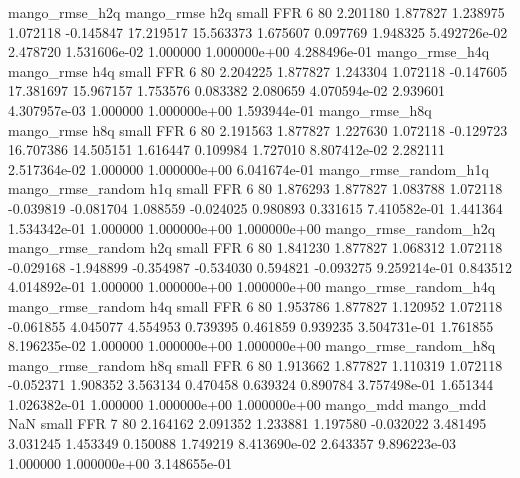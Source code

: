        mango_rmse_h2q        mango_rmse                  h2q      small      FFR                 6 80 2.201180       1.877827 1.238975       1.072118   -0.145847     17.219517     15.563373     1.675607       0.097769  1.948325 5.492726e-02     2.478720   1.531606e-02            1.000000    1.000000e+00        4.288496e-01
       mango_rmse_h4q        mango_rmse                  h4q      small      FFR                 6 80 2.204225       1.877827 1.243304       1.072118   -0.147605     17.381697     15.967157     1.753576       0.083382  2.080659 4.070594e-02     2.939601   4.307957e-03            1.000000    1.000000e+00        1.593944e-01
       mango_rmse_h8q        mango_rmse                  h8q      small      FFR                 6 80 2.191563       1.877827 1.227630       1.072118   -0.129723     16.707386     14.505151     1.616447       0.109984  1.727010 8.807412e-02     2.282111   2.517364e-02            1.000000    1.000000e+00        6.041674e-01
mango_rmse_random_h1q mango_rmse_random                  h1q      small      FFR                 6 80 1.876293       1.877827 1.083788       1.072118   -0.039819     -0.081704      1.088559    -0.024025       0.980893  0.331615 7.410582e-01     1.441364   1.534342e-01            1.000000    1.000000e+00        1.000000e+00
mango_rmse_random_h2q mango_rmse_random                  h2q      small      FFR                 6 80 1.841230       1.877827 1.068312       1.072118   -0.029168     -1.948899     -0.354987    -0.534030       0.594821 -0.093275 9.259214e-01     0.843512   4.014892e-01            1.000000    1.000000e+00        1.000000e+00
mango_rmse_random_h4q mango_rmse_random                  h4q      small      FFR                 6 80 1.953786       1.877827 1.120952       1.072118   -0.061855      4.045077      4.554953     0.739395       0.461859  0.939235 3.504731e-01     1.761855   8.196235e-02            1.000000    1.000000e+00        1.000000e+00
mango_rmse_random_h8q mango_rmse_random                  h8q      small      FFR                 6 80 1.913662       1.877827 1.110319       1.072118   -0.052371      1.908352      3.563134     0.470458       0.639324  0.890784 3.757498e-01     1.651344   1.026382e-01            1.000000    1.000000e+00        1.000000e+00
            mango_mdd         mango_mdd                  NaN      small      FFR                 7 80 2.164162       2.091352 1.233881       1.197580   -0.032022      3.481495      3.031245     1.453349       0.150088  1.749219 8.413690e-02     2.643357   9.896223e-03            1.000000    1.000000e+00        3.148655e-01
